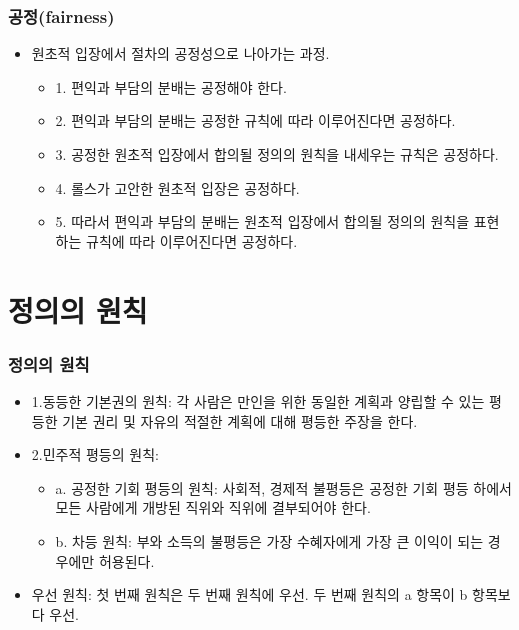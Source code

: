 \documentclass[aspectratio=169,xcolor=dvipsnames,handout]{beamer}
\begin{document}
\begin{frame}[<+->]
\frametitle{공정(fairness)}
    \begin{itemize}
        \item 원초적 입장에서 절차의 공정성으로 나아가는 과정.
        \begin{itemize}
            \item 1. 편익과 부담의 분배는 공정해야 한다. 
            \item 2. 편익과 부담의 분배는 공정한 규칙에 따라 이루어진다면 공정하다.
            \item 3. 공정한 원초적 입장에서 합의될 정의의 원칙을 내세우는 규칙은 공정하다. 
            \item 4. 롤스가 고안한 원초적 입장은 공정하다.
            \item 5. 따라서 편익과 부담의 분배는 원초적 입장에서 합의될 정의의 원칙을 표현하는 규칙에 따라 이루어진다면 공정하다.
        \end{itemize}
    \end{itemize}
\end{frame}

\section{정의의 원칙}
\begin{frame}[<+->]
\frametitle{정의의 원칙}
    \begin{itemize}
        \item  1.동등한 기본권의 원칙: 각 사람은 만인을 위한 동일한 계획과 양립할 수 있는 평등한 기본 권리 및 자유의 적절한 계획에 대해 평등한 주장을 한다.
        \item  2.민주적 평등의 원칙: 
        \begin{itemize}
            \item  a. 공정한 기회 평등의 원칙: 사회적, 경제적 불평등은 공정한 기회 평등 하에서 모든 사람에게 개방된 직위와 직위에 결부되어야 한다.
            \item  b. 차등 원칙: 부와 소득의 불평등은 가장 수혜자에게 가장 큰 이익이 되는 경우에만 허용된다.
        \end{itemize}
        \item 우선 원칙: 첫 번째 원칙은 두 번째 원칙에 우선. 두 번째 원칙의 a 항목이 b 항목보다 우선.
    \end{itemize}
\end{frame}
\end{document}
